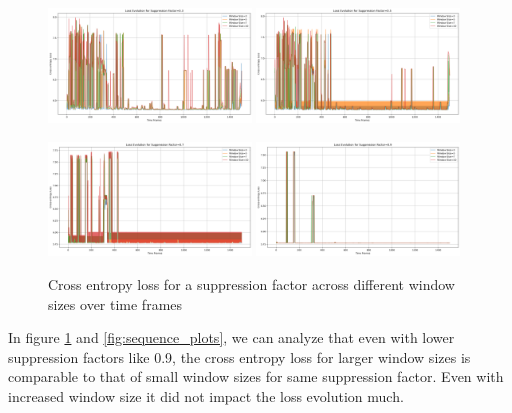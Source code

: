 \documentclass[../report.tex]{subfiles}
\begin{document}
    \begin{figure}[p]
        \centering
        \includegraphics[width=0.48\textwidth]{figures/factor_0.3_comparison.png}
        \includegraphics[width=0.48\textwidth]{figures/factor_0.5_comparison.png}
        
        \vspace{1em}
        
        \includegraphics[width=0.48\textwidth]{figures/factor_0.7_comparison.png}
        \includegraphics[width=0.48\textwidth]{figures/factor_0.9_comparison.png}
        
        \caption{Cross entropy loss for a suppression factor across different window sizes  over time frames}
        \label{fig:window_comparison}
    \end{figure}

    
    In figure \ref{fig:window_comparison} and \ref{fig:sequence_plots}, we can analyze that even with lower suppression factors like 0.9, the cross entropy loss for larger window sizes is comparable to that of small window sizes for same suppression factor. Even with increased window size it did not impact the loss evolution much.
    
\end{document}
